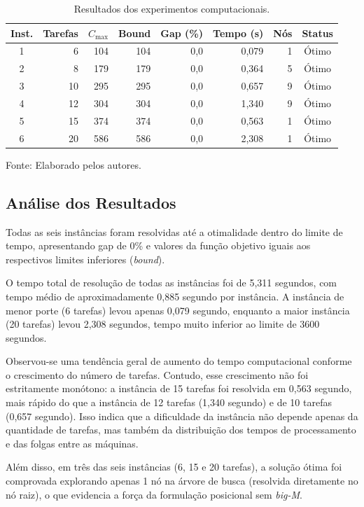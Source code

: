 \documentclass[11pt,a4paper]{article}
\begin{document}
\begin{table}[H]
\centering
\caption{Resultados dos experimentos computacionais.}
\label{tab:resultados_computacionais}
\small
\begin{tabular}{crrrrrrc}
\toprule
Inst. & Tarefas & $C_{\max}$ & Bound & Gap (\%) & Tempo (s) & Nós & Status \\ \midrule
1 & 6  & 104 & 104 & 0{,}0 & 0,079 & 1 & Ótimo \\
2 & 8  & 179 & 179 & 0{,}0 & 0,364 & 5 & Ótimo \\
3 & 10 & 295 & 295 & 0{,}0 & 0,657 & 9 & Ótimo \\
4 & 12 & 304 & 304 & 0{,}0 & 1,340 & 9 & Ótimo \\
5 & 15 & 374 & 374 & 0{,}0 & 0,563 & 1 & Ótimo \\
6 & 20 & 586 & 586 & 0{,}0 & 2,308 & 1 & Ótimo \\ \bottomrule
\end{tabular}
\smallskip

\footnotesize Fonte: Elaborado pelos autores.
\end{table}

\subsection{Análise dos Resultados}
Todas as seis instâncias foram resolvidas até a otimalidade dentro do limite de tempo, apresentando gap de 0\% e valores da função objetivo iguais aos respectivos limites inferiores (\textit{bound}).

O tempo total de resolução de todas as instâncias foi de 5,311 segundos, com tempo médio de aproximadamente 0,885 segundo por instância. A instância de menor porte (6 tarefas) levou apenas 0,079 segundo, enquanto a maior instância (20 tarefas) levou 2,308 segundos, tempo muito inferior ao limite de 3600 segundos.

Observou-se uma tendência geral de aumento do tempo computacional conforme o crescimento do número de tarefas. Contudo, esse crescimento não foi estritamente monótono: a instância de 15 tarefas foi resolvida em 0,563 segundo, mais rápido do que a instância de 12 tarefas (1,340 segundo) e de 10 tarefas (0,657 segundo). Isso indica que a dificuldade da instância não depende apenas da quantidade de tarefas, mas também da distribuição dos tempos de processamento e das folgas entre as máquinas.

Além disso, em três das seis instâncias (6, 15 e 20 tarefas), a solução ótima foi comprovada explorando apenas 1 nó na árvore de busca (resolvida diretamente no nó raiz), o que evidencia a força da formulação posicional sem \textit{big-M}.
\end{document}
